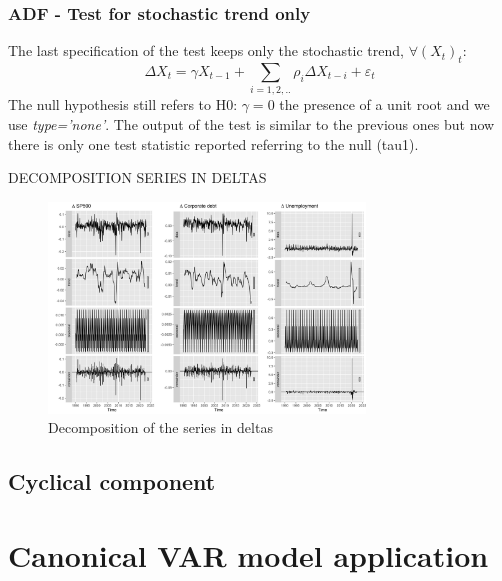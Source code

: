 \documentclass[hidelinks,12pts]{article}
\DeclareMathOperator{\1}{\mathbbm{1}}
\begin{document}
\subsubsection{ADF - Test for stochastic trend only}
The last specification of the test keeps only the stochastic trend, $\forall (X_t)_t$: 
    \begin{equation}
        \Delta X_t = \gamma X_{t-1} +\sum_{i=1,2,..}\rho_i \Delta X_{t-i} + \varepsilon_t
    \end{equation}
The null hypothesis still refers to H0: $\gamma =0$ the presence of a unit root and we use \emph{type='none'}.
The output of the test is similar to the previous ones but now there is only one test statistic reported referring to the null (tau1).





DECOMPOSITION SERIES IN DELTAS 

\begin{figure}[h!]
    \centering
    \includegraphics[width = 0.75\textwidth]{IMAGES/decomposition_iii_deltas.png}
    \caption{Decomposition of the series in deltas}
\end{figure}

    



    \subsection{Cyclical component}






\section{Canonical VAR model application}\label{sec:var}
\end{document}
